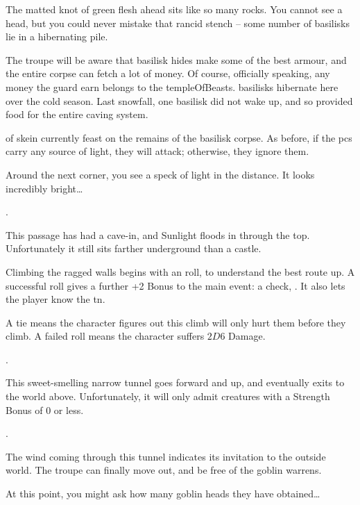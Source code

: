 \begin{multicols}{2}
  \begin{boxtext}
    The matted knot of green flesh ahead sits like so many rocks.
    You cannot see a head, but you could never mistake that rancid stench -- some number of \glspl{basilisk} lie in a hibernating pile.
  \end{boxtext}


  The troupe will be aware that \gls{basilisk} hides make some of the best armour, and the entire corpse can fetch a lot of money.
  Of course, officially speaking, any money the \gls{guard} earn belongs to the \gls{templeOfBeasts}.%
\else
  \Glspl{basilisk} hibernate here over the cold season.
  Last snowfall, one \gls{basilisk} did not wake up, and so provided food for the entire caving system.

   of skein currently feast on the remains of the \gls{basilisk} corpse.
  As before, if the \glspl{pc} carry any source of light, they will attack; otherwise, they ignore them.

  \skeinSwarm

\fi

\begin{boxtext}
  Around the next corner, you see a speck of light in the distance.
  It looks incredibly bright\ldots
\end{boxtext}

.


This passage has had a cave-in, and Sunlight floods in through the top.
Unfortunately it still sits farther underground than a castle.

Climbing the ragged walls begins with an  roll, to understand the best route up.
A successful roll gives a further +2 Bonus to the main event: a  check, \tn[14].
It also lets the player know the \gls{tn}.

A tie means the character figures out this climb will only hurt them before they climb.
A failed roll means the character suffers $2D6$ Damage.

.


This sweet-smelling narrow tunnel goes forward and up, and eventually exits to the world above.
Unfortunately, it will only admit creatures with a Strength Bonus of 0 or less.

.


The wind coming through this tunnel indicates its invitation to the outside world.
The troupe can finally move out, and be free of the goblin warrens.

At this point, you might ask how many goblin heads they have obtained\ldots

\end{multicols}
